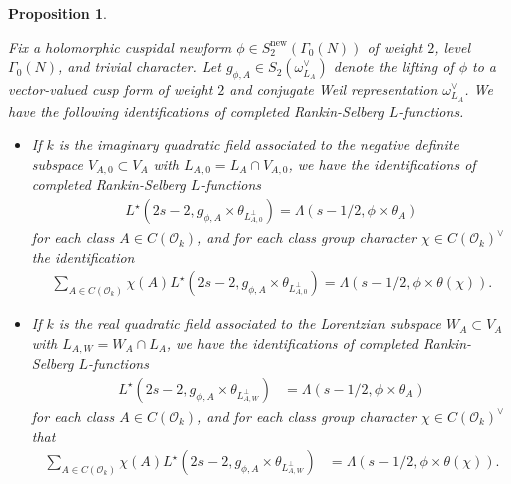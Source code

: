 \documentclass[10pt,a4paper]{amsart}
\newtheorem{proposition}{Proposition}
\begin{document}
\begin{proposition}\label{RS-equiv} 

Fix a holomorphic cuspidal newform $\phi \in S^{\operatorname{new}}_2(\Gamma_0(N))$ of weight $2$, level $\Gamma_0(N)$, and trivial character. 
Let $g_{\phi, A} \in S_2(\omega_{L_A}^{\vee})$ denote the lifting of $\phi$ to a vector-valued cusp form of weight $2$ 
and conjugate Weil representation $\omega_{L_A}^{\vee}$. We have the following identifications of completed Rankin-Selberg $L$-functions. \\

\begin{itemize}

\item[(i)] If $k$ is the imaginary quadratic field associated to the negative definite subspace $V_{A, 0} \subset V_A$
with $L_{A,0} = L_A \cap V_{A,0}$, we have the identifications of completed Rankin-Selberg $L$-functions 
\begin{align*} L^{\star}(2s-2, g_{\phi, A} \times \theta_{L_{A, 0}^{\perp}}) 
= \Lambda(s-1/2, \phi \times \theta_A) \end{align*} 
for each class $A \in C(\mathcal{O}_k)$, and for each class group character $\chi \in C(\mathcal{O}_k)^{\vee}$ the identification 
\begin{align*} \sum\limits_{A \in C(\mathcal{O}_k)} \chi(A) L^{\star}(2s-2, g_{\phi, A} \times \theta_{L_{A, 0}^{\perp}}) 
= \Lambda(s-1/2, \phi \times \theta(\chi)). \end{align*} 

\item[(ii)] If $k$ is the real quadratic field associated to the Lorentzian subspace 
$W_A \subset V_A$ with $L_{A,W} = W_A \cap L_A$, we have the identifications of completed Rankin-Selberg $L$-functions 
\begin{align*} L^{\star}(2s-2, g_{\phi, A} \times \theta_{L_{A, W}^{\perp}}) &= \Lambda(s-1/2, \phi \times \theta_A)\end{align*} 
for each class $A \in C(\mathcal{O}_k)$, and for each class group character $\chi \in C(\mathcal{O}_k)^{\vee}$ that 
\begin{align*} \sum\limits_{A \in C(\mathcal{O}_k)} \chi(A) L^{\star}(2s-2, g_{\phi, A} \times \theta_{L_{A, W}^{\perp}}) 
&= \Lambda(s-1/2, \phi \times \theta(\chi)).\end{align*}

\end{itemize}

\end{proposition}
\end{document}

